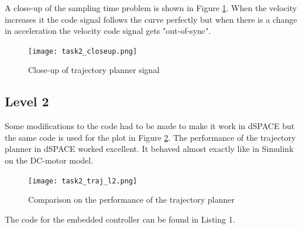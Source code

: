 A close-up of the sampling time problem is shown in Figure
\ref{fig:task2_closeup}. When the velocity increases it the code signal
follows the curve perfectly but when there is a change in acceleration
the velocity code signal gets "out-of-sync".

\begin{figure}[H]
	\begin{center}
	
		\texttt{[image: task2\_closeup.png]}
		\caption{Close-up of trajectory planner signal}
		\label{fig:task2_closeup}
	\end{center}
\end{figure}


\subsection*{Level 2}
Some modifications to the code had to be made to make it work in dSPACE
but the same code is used for the plot in Figure
\ref{fig:task2_traj_l2}. The performance of the trajectory planner in
dSPACE worked excellent. It behaved almost exactly like in Simulink on
the DC-motor model. 
\begin{figure}[H]
	\begin{center}
	
		\texttt{[image: task2\_traj\_l2.png]}
		\caption{Comparison on the performance of the trajectory planner}
		\label{fig:task2_traj_l2}
	\end{center}
\end{figure}
The code for the embedded controller can be found in Listing 1.

%
